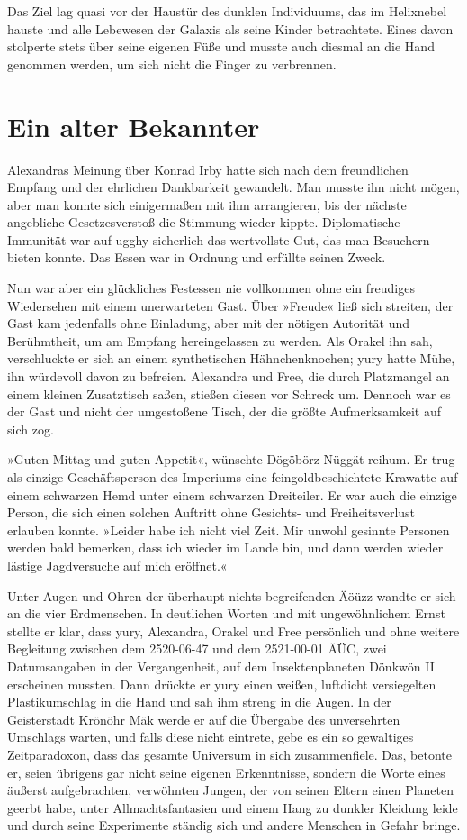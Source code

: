 Das Ziel lag quasi vor der Haustür des dunklen Individuums, das im Helixnebel hauste und alle Lebewesen der Galaxis als seine Kinder betrachtete. Eines davon stolperte stets über seine eigenen Füße und musste auch diesmal an die Hand genommen werden, um sich nicht die Finger zu verbrennen.


\chapter{Ein alter Bekannter}

Alexandras Meinung über Konrad Irby hatte sich nach dem freundlichen Empfang und der ehrlichen Dankbarkeit gewandelt. Man musste ihn nicht mögen, aber man konnte sich einigermaßen mit ihm arrangieren, bis der nächste angebliche Gesetzesverstoß die Stimmung wieder kippte. Diplomatische Immunität war auf ugghy sicherlich das wertvollste Gut, das man Besuchern bieten konnte. Das Essen war in Ordnung und erfüllte seinen Zweck.

Nun war aber ein glückliches Festessen nie vollkommen ohne ein freudiges Wiedersehen mit einem unerwarteten Gast. Über »Freude« ließ sich streiten, der Gast kam jedenfalls ohne Einladung, aber mit der nötigen Autorität und Berühmtheit, um am Empfang hereingelassen zu werden. Als Orakel ihn sah, verschluckte er sich an einem synthetischen Hähnchenknochen; yury hatte Mühe, ihn würdevoll davon zu befreien. Alexandra und Free, die durch Platzmangel an einem kleinen Zusatztisch saßen, stießen diesen vor Schreck um. Dennoch war es der Gast und nicht der umgestoßene Tisch, der die größte Aufmerksamkeit auf sich zog.

»Guten Mittag und guten Appetit«, wünschte Dögöbörz Nüggät reihum. Er trug als einzige Geschäftsperson des Imperiums eine feingoldbeschichtete Krawatte auf einem schwarzen Hemd unter einem schwarzen Dreiteiler. Er war auch die einzige Person, die sich einen solchen Auftritt ohne Gesichts- und Freiheitsverlust erlauben konnte. »Leider habe ich nicht viel Zeit. Mir unwohl gesinnte Personen werden bald bemerken, dass ich wieder im Lande bin, und dann werden wieder lästige Jagdversuche auf mich eröffnet.«

Unter Augen und Ohren der überhaupt nichts begreifenden Äöüzz wandte er sich an die vier Erdmenschen. In deutlichen Worten und mit ungewöhnlichem Ernst stellte er klar, dass yury, Alexandra, Orakel und Free persönlich und ohne weitere Begleitung zwischen dem 2520-06-47 und dem 2521-00-01 ÄÜC, zwei Datumsangaben in der Vergangenheit, auf dem Insektenplaneten Dönkwön II erscheinen mussten. Dann drückte er yury einen weißen, luftdicht versiegelten Plastikumschlag in die Hand und sah ihm streng in die Augen. In der Geisterstadt Krönöhr Mäk werde er auf die Übergabe des unversehrten Umschlags warten, und falls diese nicht eintrete, gebe es ein so gewaltiges Zeitparadoxon, dass das gesamte Universum in sich zusammenfiele. Das, betonte er, seien übrigens gar nicht seine eigenen Erkenntnisse, sondern die Worte eines äußerst aufgebrachten, verwöhnten Jungen, der von seinen Eltern einen Planeten geerbt habe, unter Allmachtsfantasien und einem Hang zu dunkler Kleidung leide und durch seine Experimente ständig sich und andere Menschen in Gefahr bringe.

